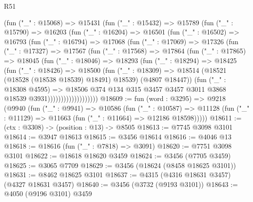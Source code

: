 \begin{lexlean}{R51}
\begin{coremodule}
              (fun ("_" : @15068) =>
              @15431
                (fun ("_" : @15432) =>
                @15789
                  (fun ("_" : @15790) =>
                  @16203
                    (fun ("_" : @16204) =>
                    @16501
                      (fun ("_" : @16502) =>
                      @16793
                        (fun ("_" : @16794) =>
                        @17068
                          (fun ("_" : @17069) =>
                          @17326
                            (fun ("_" : @17327) =>
                            @17567
                              (fun ("_" : @17568) =>
                              @17864
                                (fun ("_" : @17865) =>
                                @18045
                                  (fun ("_" : @18046) =>
                                  @18293
                                    (fun ("_" : @18294) =>
                                    @18425
                                      (fun ("_" : @18426) =>
                                      @18500
                                        (fun ("_" : @18309) =>
                                        @18514
                                          (@18521 (@18528 (@18538 @18539) @18491) @18539)
                                          (@4807 @18447))
                                        (fun ("_" : @18308 @4595) =>
                                        @18506
                                          @374
                                          @134
                                          @315
                                          @3457
                                          @3457
                                          @3011
                                          @3868
                                          @18539
                                          @3931)))))))))))))))))))
@18609 := fun (word : @3295) =>
  @9218
    (@9940
      (fun ("_" : @9941) =>
      @10586
        (fun ("_" : @10587) =>
        @11128 (fun ("_" : @11129) => @11663 (fun ("_" : @11664) => @12186 @18598)))))
@18611 := (ctx : @3308) -> (position : @13) -> @8505
@18613 := @7745 @3098 @3101
@18614 := @3947 @18613
@18615 := @3456 @18614
@18616 := @4046 @13
@18618 := @18616 (fun ("_" : @7818) => @3091)
@18620 := @7751 @3098 @3101
@18622 := @18618 @18620 @3459
@18624 := @3456 (@7705 @3459)
@18625 := @3065 @7709
@18629 := @3456 (@18624 (@8458 @18625 @3101))
@18631 := @8462 @18625 @3101
@18637 := @4315 (@4316 @18631 @3457) (@4327 @18631 @3457)
@18640 := @3456 (@3732 (@9193 @3101))
@18643 := @4050 (@9196 @3101) @3459

\end{coremodule}
\end{lexlean}
